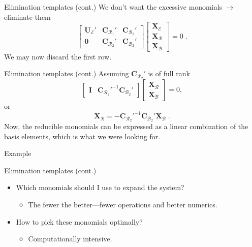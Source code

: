 \documentclass[aspectratio=169]{beamer}
\newcommand{\mat}[1]{\bm{#1}}
\newcommand{\CRk}[1]{\ensuremath{\mat{C}_{\mathcal{R}_{#1}}}}
\newcommand{\CBk}[1]{\ensuremath{\mat{C}_{\mathcal{B}_{#1}}}}
\newcommand{\XE}{\ensuremath{\mat{X}_\mathcal{E}}}
\newcommand{\XR}{\ensuremath{\mat{X}_\mathcal{R}}}
\newcommand{\XB}{\ensuremath{\mat{X}_\mathcal{B}}}
\begin{document}
\begin{frame}{Elimination templates (cont.)}
We don't want the excessive monomials $\longrightarrow$ eliminate them
\begin{equation*}
    \begin{bmatrix}
        \mat{U}_\mathcal{E}' &
        \CRk{1}' &
        \CBk{1}' \\
        \mat{0} &
        \CRk{2}' &
        \CBk{2}'
    \end{bmatrix}
    \begin{bmatrix}
        \XE \\
        \XR \\
        \XB
    \end{bmatrix}
    = 0\;.
\end{equation*}
We may now discard the first row.
\end{frame}

\begin{frame}{Elimination templates (cont.)}
Assuming $\CRk{2}'$ is of full rank
\begin{equation*}
    \begin{bmatrix}
        \mat{I} &
        \CRk{2}'^{-1}\CBk{2}'
    \end{bmatrix}
    \begin{bmatrix}
        \XR \\
        \XB
    \end{bmatrix}
    = 0,
\end{equation*}
or
\begin{equation*}
    \XR = -\CRk{2}'^{-1}\CBk{2}'\XB\;.
\end{equation*}
Now, the reducible monomials can be expressed as a linear combination of the basis elements,
which is what we were looking for.
\end{frame}

\begin{frame}{Example}
\end{frame}

\begin{frame}{Elimination templates (cont.)}
\begin{itemize}
\item Which monomials should I use to expand the system?
    \begin{itemize}
    \item The fewer the better---fewer operations and better numerics.
    \end{itemize}
\item How to pick these monomials optimally?
    \begin{itemize}
    \item Computationally intensive.
    \end{itemize}
\end{itemize}
\end{frame}
\end{document}
